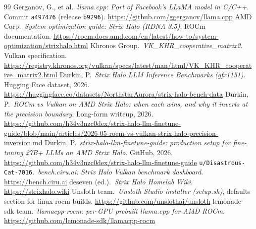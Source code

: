\documentclass[10pt,a4paper]{article}
\begin{document}
\begin{thebibliography}{99}
 Gerganov, G., et al.\ \emph{llama.cpp: Port of Facebook's LLaMA model in C/C++}. Commit \texttt{a497476} (release \texttt{b9296}). \url{https://github.com/ggerganov/llama.cpp}
 AMD Corp.\ \emph{System optimization guide: Strix Halo (RDNA 3.5)}. ROCm documentation. \url{https://rocm.docs.amd.com/en/latest/how-to/system-optimization/strixhalo.html}
 Khronos Group.\ \emph{VK\_KHR\_cooperative\_matrix2}. Vulkan specification. \url{https://registry.khronos.org/vulkan/specs/latest/man/html/VK_KHR_cooperative_matrix2.html}
 Durkin, P.\ \emph{Strix Halo LLM Inference Benchmarks (gfx1151)}. Hugging Face dataset, 2026. \url{https://huggingface.co/datasets/NorthstarAurora/strix-halo-bench-data}
 Durkin, P.\ \emph{ROCm vs Vulkan on AMD Strix Halo: when each wins, and why it inverts at the precision boundary}. Long-form writeup, 2026. \url{https://github.com/h34v3nzc0dex/strix-halo-llm-finetune-guide/blob/main/articles/2026-05-rocm-vs-vulkan-strix-halo-precision-inversion.md}
 Durkin, P.\ \emph{strix-halo-llm-finetune-guide: production setup for fine-tuning 27B+ LLMs on AMD Strix Halo}. GitHub, 2026. \url{https://github.com/h34v3nzc0dex/strix-halo-llm-finetune-guide}
 \texttt{u/Disastrous-Cat-7016}.\ \emph{bench.ciru.ai: Strix Halo Vulkan benchmark dashboard}. \url{https://bench.ciru.ai}
 deseven (ed.).\ \emph{Strix Halo Homelab Wiki}. \url{https://strixhalo.wiki}
 Unsloth team.\ \emph{Unsloth Studio installer (setup.sh)}, defaults section for linux-rocm builds. \url{https://github.com/unslothai/unsloth}
 lemonade-sdk team.\ \emph{llamacpp-rocm: per-GPU prebuilt llama.cpp for AMD ROCm}. \url{https://github.com/lemonade-sdk/llamacpp-rocm}
\end{thebibliography}
\end{document}
